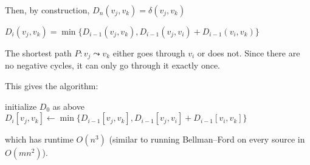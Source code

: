 Then, by construction, $D_n(v_j,v_k) = \delta(v_j,v_k)$

\begin{claim}
  $D_i(v_j,v_k) = \min\{D_{i-1}(v_j,v_k), D_{i-1}(v_j,v_i) + D_{i-1}(v_i,v_k)\}$
\end{claim}
\begin{prf}
  The shortest path $P : v_j \leadsto v_k$ either goes through $v_i$ or does not.
  Since there are no negative cycles, it can only go through it exactly once.
\end{prf}

This gives the algorithm:
\begin{algorithm}[H]
  \caption{}
  \begin{algorithmic}[1]
    \State initialize $D_0$ as above
          \State $D_i[v_j,v_k] \gets \min\{D_{i-1}[v_j,v_k],D_{i-1}[v_j,v_i] + D_{i-1}[v_i,v_k]\}$
        \EndFor
      \EndFor
    \EndFor
  \end{algorithmic}
\end{algorithm}
which has runtime $O(n^3)$ (similar to running Bellman--Ford on every source in $O(mn^2)$).


